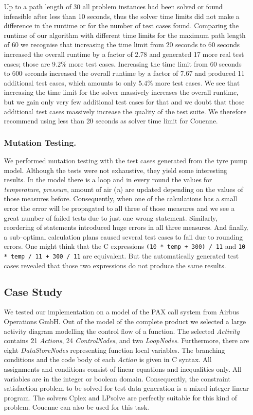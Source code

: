 \documentclass[runningheads,a4paper]{llncs}%
\newcommand{\UMLType}[1]{\textsf{\textit{#1}}} %
\newcommand{\OCLVar}[1]{\textit{#1}}
\begin{document}
Up to a path length of 30 all problem instances had been solved or found
infeasible after less than 10 seconds, thus the solver time limits did not make
a difference in the runtime or for the number of test cases found. Comparing the
runtime of our algorithm with different time limits for the maximum path length
of 60 we recognise that increasing the time limit from 20 seconds to 60 seconds
increased the overall runtime by a factor of 2.78 and generated 17 more real
test cases; those are 9.2\% more test cases. Increasing the time limit from 60
seconds to 600 seconds increased the overall runtime by a factor of 7.67 and
produced 11 additional test cases, which amounts to only 5.4\% more test cases.
We see that increasing the time limit for the solver massively increases the
overall runtime, but we gain only very few additional test cases for that and we
doubt that those additional test cases massively increase the quality of the
test suite. We therefore recommend using less than 20 seconds as solver time
limit for Couenne.
\subsubsection{Mutation Testing.}
We performed mutation testing with the test cases generated from the tyre pump
model. Although the tests were not exhaustive, they yield some interesting
results. In the model there is a loop and in every round the values for
\OCLVar{temperature}, \OCLVar{pressure}, amount of air (\OCLVar{n}) are updated
depending on the values of those measures before. Consequently, when one of the
calculations has a small error the error will be propagated to all three of
those measures and we see a great number of failed tests due to just one wrong
statement. Similarly, reordering of statements introduced huge errors in all
three measures. And finally, a sub--optimal calculation plans caused several
test cases to fail due to rounding errors. One might think that the C
expressions \verb$(10 * temp + 300) / 11$ and \verb$10 * temp / 11 + 300 / 11$
are equivalent. But the automatically generated test cases revealed that those
two expressions do not produce the same results.
\subsection{Case Study}
\label{sec:CaseStudy}
We tested our implementation on a model of the PAX call system from Airbus
Operations GmbH. Out of the model of the complete product we selected a large
activity diagram modelling the control flow of a function. The selected
\UMLType{Activity} contains 21 \UMLType{Actions}, 24 \UMLType{ControlNodes}, and
two \UMLType{LoopNodes}. Furthermore, there are eight \UMLType{DataStoreNodes}
representing function local variables. The branching conditions and the code
body of each \UMLType{Action} is given in C syntax. All assignments and
conditions consist of linear equations and inequalities only. All variables are
in the integer or boolean domain. Consequently, the constraint satisfaction
problem to be solved for test data generation is a mixed integer linear program.
The solvers Cplex and LPsolve are perfectly suitable for this kind of problem.
Couenne can also be used for this task.
\end{document}
